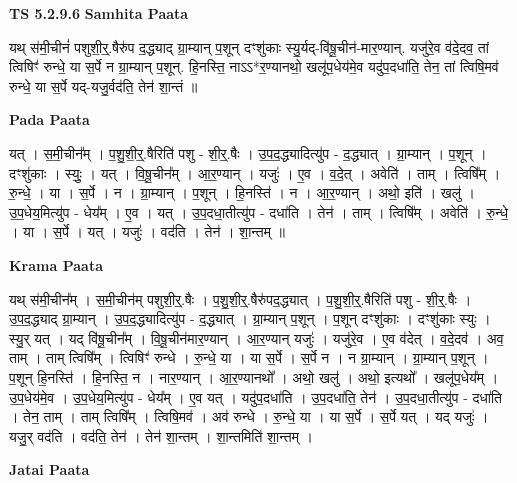 \documentclass[17pt]{extarticle}
\begin{document}
\textbf{TS 5.2.9.6 } \newline
\textbf{Samhita Paata} \newline

यथ् स॑मी॒चीनं॑ पशुशी॒र्॒.षैरु॑प द॒द्ध्याद् ग्रा॒म्यान् प॒शून् दꣳशु॑काः स्यु॒र्यद्-वि॑षू॒चीन॑-मार॒ण्यान्. यजु॑रे॒व व॑दे॒दव॒ तां त्विषिꣳ॑ रुन्धे॒ या स॒र्पे न ग्रा॒म्यान् प॒शून्. हि॒नस्ति॒ नाऽऽ*र॒ण्यानथो॒ खलू॑प॒धेय॑मे॒व यदु॑प॒दधा॑ति॒ तेन॒ तां त्विषि॒मव॑ रुन्धे॒ या स॒र्पे यद्-यजु॒र्वद॑ति॒ तेन॑ शा॒न्तं ॥ \newline

\textbf{Pada Paata} \newline

यत् । स॒मी॒चीन᳚म् । प॒शु॒शी॒र्॒.षैरिति॑ पशु - शी॒र्॒.षैः । उ॒प॒द॒द्ध्यादित्यु॑प - द॒द्ध्यात् । ग्रा॒म्यान् । प॒शून् । दꣳशु॑काः । स्युः॒ । यत् । वि॒षू॒चीन᳚म् । आ॒र॒ण्यान् । यजुः॑ । ए॒व । व॒दे॒त् । अवेति॑ । ताम् । त्विषि᳚म् । रु॒न्धे॒ । या । स॒र्पे । न । ग्रा॒म्यान् । प॒शून् । हि॒नस्ति॑ । न । आ॒र॒ण्यान् । अथो॒ इति॑ । खलु॑ । उ॒प॒धेय॒मित्यु॑प - धेय᳚म् । ए॒व । यत् । उ॒प॒दधा॒तीत्यु॑प - दधा॑ति । तेन॑ । ताम् । त्विषि᳚म् । अवेति॑ । रु॒न्धे॒ । या । स॒र्पे । यत् । यजुः॑ । वद॑ति । तेन॑ । शा॒न्तम् ॥  \newline


\textbf{Krama Paata} \newline

यथ् स॑मी॒चीन᳚म् । स॒मी॒चीन॑म् पशुशी॒र्॒.षैः । प॒शु॒शी॒र्॒.षैरु॑पद॒द्ध्यात् । प॒शु॒शी॒र्॒.षैरिति॑ पशु - शी॒र्॒.षैः । उ॒प॒द॒द्ध्याद् ग्रा॒म्यान् । उ॒प॒द॒द्ध्यादित्यु॑प - द॒द्ध्यात् । ग्रा॒म्यान् प॒शून् । प॒शून् दꣳशु॑काः । दꣳशु॑काः स्युः । स्यु॒र् यत् । यद् वि॑षू॒चीन᳚म् । वि॒षू॒चीन॑मार॒ण्यान् । आ॒र॒ण्यान् यजुः॑ । यजु॑रे॒व । ए॒व व॑देत् । व॒दे॒दव॑ । अव॒ ताम् । ताम् त्विषि᳚म् । त्विषिꣳ॑ रुन्धे । रु॒न्धे॒ या । या स॒र्पे । स॒र्पे न । न ग्रा॒म्यान् । ग्रा॒म्यान् प॒शून् । प॒शून् हि॒नस्ति॑ । हि॒नस्ति॒ न । नार॒ण्यान् । आ॒र॒ण्यानथो᳚ । अथो॒ खलु॑ । अथो॒ इत्यथो᳚ । खलू॑प॒धेय᳚म् । उ॒प॒धेय॑मे॒व । उ॒प॒धेय॒मित्यु॑प - धेय᳚म् । ए॒व यत् । यदु॑प॒दधा॑ति । उ॒प॒दधा॑ति॒ तेन॑ । उ॒प॒दधा॒तीत्यु॑प - दधा॑ति । तेन॒ ताम् । ताम् त्विषि᳚म् । त्विषि॒मव॑ । अव॑ रुन्धे । रु॒न्धे॒ या । या स॒र्पे । स॒र्पे यत् । यद् यजुः॑ । यजु॒र् वद॑ति । वद॑ति॒ तेन॑ । तेन॑ शा॒न्तम् । शा॒न्तमिति॑ शा॒न्तम् । \newline

\textbf{Jatai Paata} \newline
\end{document}
